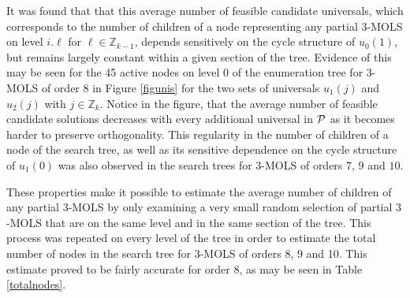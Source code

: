 It was found that that this average number of feasible candidate universals, which corresponds to the number of children of a node representing any partial $3$-MOLS  on level $i.\ell$ for $\ell \in \mathbb{Z}_{k-1}$,  depends sensitively on the cycle structure of $u_0{(1)}$, but remains largely constant within a given section of the tree.  Evidence of this may be seen for the 45 active nodes on level 0 of the enumeration tree for $3$-MOLS of order $8$ in  Figure \ref{figunis} for the two sets of universals $u_1{(j)}$ and $u_2{(j)}$ with $j\in \mathbb{Z}_k$. Notice in the figure, that the average number of feasible candidate solutions decreases with every additional universal in $\mathcal{P}$ as it becomes harder to preserve orthogonality.  This  regularity in the number of children of a node of the search tree, as well as its sensitive dependence on the cycle structure of $u_1{(0)}$ was also observed in the search trees for $3$-MOLS of orders $7$, $9$ and $10$. 

These properties make it possible to estimate the average number of children of any partial $3$-MOLS by only examining a very small random selection of partial $3$-MOLS that are on the same level and in the same section of the tree. This process was repeated on every level  of the tree in order to estimate the total number 
of nodes in the search tree for $3$-MOLS of orders 8, 9 and 10.  This estimate  proved to be fairly accurate for order 8, as may be seen in Table \ref{totalnodes}.


